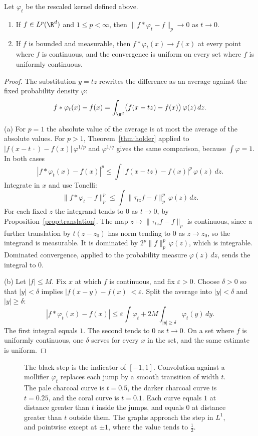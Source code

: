 \begin{theorem}\label{thm:approxid}
Let $\varphi_t$ be the rescaled kernel defined above.
\begin{enumerate}[label=(\alph*)]
\item If $f\in L^p(\R^d)$ and $1\le p<\infty$, then $\|f*\varphi_t-f\|_p\to0$ as $t\to0$.
\item If $f$ is bounded and measurable, then $f*\varphi_t(x)\to f(x)$ at every point where $f$ is continuous, and the convergence is uniform on every set where $f$ is uniformly continuous.
\end{enumerate}
\end{theorem}
\begin{proof}
The substitution $y=tz$ rewrites the difference as an average against the fixed probability density $\varphi$:
\[f*\varphi_t(x)-f(x)=\int_{\R^d}\bigl(f(x-tz)-f(x)\bigr)\,\varphi(z)\,dz.\]

(a) For $p=1$ the absolute value of the average is at most the average of the absolute values. For $p>1$, Theorem~\ref{thm:holder} applied to $|f(x-t\,\cdot)-f(x)|\,\varphi^{1/p}$ and $\varphi^{1/q}$ gives the same comparison, because $\int\varphi=1$. In both cases
\[|f*\varphi_t(x)-f(x)|^p\le\int|f(x-tz)-f(x)|^p\,\varphi(z)\,dz.\]
Integrate in $x$ and use Tonelli:
\[\|f*\varphi_t-f\|_p^p\le\int\|\tau_{tz}f-f\|_p^p\,\varphi(z)\,dz.\]
For each fixed $z$ the integrand tends to $0$ as $t\to0$, by Proposition~\ref{prop:translation}. The map $z\mapsto\|\tau_{tz}f-f\|_p$ is continuous, since a further translation by $t(z-z_0)$ has norm tending to $0$ as $z\to z_0$, so the integrand is measurable. It is dominated by $2^p\|f\|_p^p\,\varphi(z)$, which is integrable. Dominated convergence, applied to the probability measure $\varphi(z)\,dz$, sends the integral to $0$.

(b) Let $|f|\le M$. Fix $x$ at which $f$ is continuous, and fix $\varepsilon>0$. Choose $\delta>0$ so that $|y|<\delta$ implies $|f(x-y)-f(x)|<\varepsilon$. Split the average into $|y|<\delta$ and $|y|\ge\delta$:
\[|f*\varphi_t(x)-f(x)|\le\varepsilon\int\varphi_t+2M\int_{|y|\ge\delta}\varphi_t(y)\,dy.\]
The first integral equals $1$. The second tends to $0$ as $t\to0$. On a set where $f$ is uniformly continuous, one $\delta$ serves for every $x$ in the set, and the same estimate is uniform.
\end{proof}

\begin{figure}[ht]
\centering
{}
\caption{The black step is the indicator of $[-1,1]$. Convolution against a mollifier $\varphi_t$ replaces each jump by a smooth transition of width $t$. The pale charcoal curve is $t=0.5$, the darker charcoal curve is $t=0.25$, and the coral curve is $t=0.1$. Each curve equals $1$ at distance greater than $t$ inside the jumps, and equals $0$ at distance greater than $t$ outside them. The graphs approach the step in $L^1$, and pointwise except at $\pm1$, where the value tends to $\frac12$.}
\label{fig:mollify}
\end{figure}

